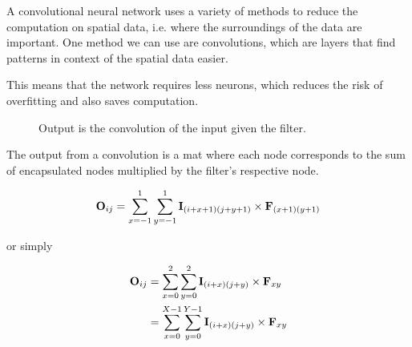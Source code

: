 A convolutional neural network uses a variety of methods to reduce the computation on spatial data, i.e. where the surroundings of the data are important. One method we can use are convolutions, which are \gls{layer}s that find patterns in context of the spatial data easier.\cite[p.~7]{cnn}

This means that the network
requires less \gls{neuron}s, which reduces the risk of overfitting and also saves computation.

\begin{figure}[h]
\setlength{\unitlength}{0.14in}
\centering
{}
\caption{Output is the convolution of the input given the filter.}
\label{fig:conv}
\end{figure}

The output from a convolution is a \gls{mat} where each node corresponds to the sum of encapsulated nodes multiplied by the filter's respective node.

\begin{equation}
\mathbf{O}_{ij}=\sum^{1}_{x=-1}{\sum^{1}_{y=-1}{\mathbf{I}_{(i+x+1)(j+y+1)}\times \mathbf{F}_{(x+1)(y+1)}}}
\end{equation}

or simply

\begin{equation}
\begin{split}
\mathbf{O}_{ij}&=\sum^{2}_{x=0}{\sum^{2}_{y=0}{\mathbf{I}_{(i+x)(j+y)}\times \mathbf{F}_{xy}}}\\
&=\sum^{X-1}_{x=0}{\sum^{Y-1}_{y=0}{\mathbf{I}_{(i+x)(j+y)}\times \mathbf{F}_{xy}}}
\end{split}
\end{equation}

